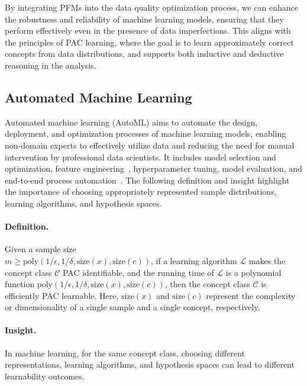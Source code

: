   By integrating PFMs into the data quality optimization process, we can enhance the robustness and reliability of machine learning models, ensuring that they perform effectively even in the presence of data imperfections. This aligns with the principles of PAC learning, where the goal is to learn approximately correct concepts from data distributions, and supports both inductive and deductive reasoning in the analysis.
  
  \subsection{Automated Machine Learning}\label{sec:auto_ml}
  
  Automated machine learning (AutoML) aims to automate the design, deployment, and optimization processes of machine learning models, enabling non-domain experts to effectively utilize data and reducing the need for manual intervention by professional data scientists. It includes model selection and optimization, feature engineering~\cite{Hollmann2023LargeLM}, hyperparameter tuning, model evaluation, and end-to-end process automation~\cite{salehin2024automl}. The following definition and insight highlight the importance of choosing appropriately represented sample distributions, learning algorithms, and hypothesis spaces.
  
  \paragraph{Definition.} Given a sample size \\ $m \geq \text{poly}(1/\epsilon, 1/ \delta, \text{size}(x), \text{size}(c))$, if a learning algorithm $\mathcal{L}$ makes the concept class $\mathcal{C}$ PAC identifiable, and the running time of $\mathcal{L}$ is a polynomial function $\text{poly}(1/\epsilon, 1/ \delta, \text{size}(x), \text{size}(c))$, then the concept class $\mathcal{C}$ is efficiently PAC learnable. Here, $\text{size}(x)$ and $\text{size}(c)$ represent the complexity or dimensionality of a single sample and a single concept, respectively.
  
  \paragraph{Insight.} In machine learning, for the same concept class, choosing different representations, learning algorithms, and hypothesis spaces can lead to different learnability outcomes.
  
